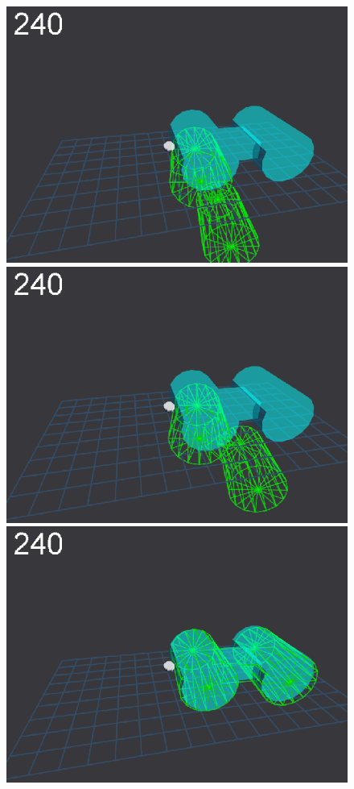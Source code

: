 \begin{figure}[tbp]
{\includegraphics[width=\imgCXwid]{images/C5_1exp_6_4}
\includegraphics[width=\imgCXwid]{images/C5_2exp_6_4}
\includegraphics[width=\imgCXwid]{images/C5_3exp_6_4}
}
\end{figure}

